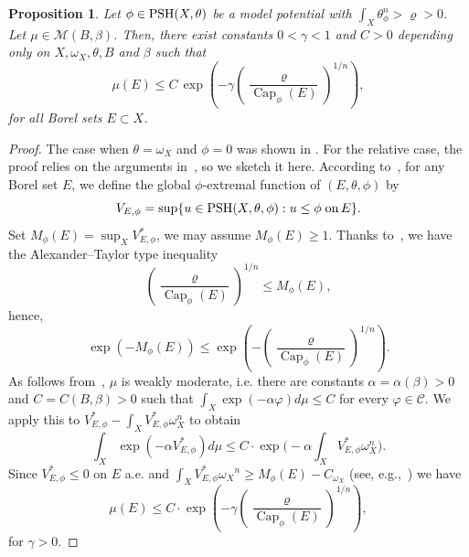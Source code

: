\documentclass[a4paper,11pt]{amsart}
\numberwithin{equation}{section}
\newtheorem{proposition}[theorem]{Proposition}
\theoremstyle{definition}
\newcommand{\dist}{\mathop{\mathrm{dist}}\nolimits}
\newcommand{\PSH}{{\rm PSH}}
\newcommand{\capacity}{\mathop{\mathrm{Cap}}\nolimits}
\begin{document}
 
\begin{proposition}\label{the exp cap}
	Let $\phi\in \PSH(X, \theta)$ be a model potential with $\int_X\theta_{\phi}^n>\varrho>0$. 
    Let $\mu\in\mathcal{M}(B,\beta)$.
    Then, there exist constants
	$0<\gamma<1$ and $C>0$ depending only on $X, \omega_X, \theta, B$ and $\beta$ such that
	\begin{equation}\label{eq0 the exp cap}
		\mu (E)\leq C\,
		\exp\left(-\gamma\left(\dfrac{\varrho}{\capacity_{\phi}(E)}\right)^{1/n} \right),
	\end{equation}
	for all Borel sets $E\subset X$. 
\end{proposition}
\begin{proof} The case when $\theta=\omega_X$ and $\phi=0$ was shown in \cite[Propositions 2.4, 4.4]{dinh2014characterization}. For the relative case,
   the proof relies on the arguments in~\cite[Proposition 4.30]{darvas2018monotonicity}, so we sketch it here. 
   According to~\cite[Section 4A2]{darvas2018monotonicity}, for any Borel set $E$, we define the global $\phi$-extremal function of $(E,\theta,\phi)$ by
   \[V_{E,\phi}=\sup\{ u\in\PSH(X,\theta,\phi): u\leq \phi \;\text{on}\, E\}. \]
 Set $M_\phi(E)=\sup_X V^*_{E,\phi}$, we may assume $M_\phi(E)\geq 1$.  Thanks to~\cite[Lemma 4.9]{darvas2018monotonicity}, we have the Alexander--Taylor type inequality
 \[ \left(\frac{\varrho}{\capacity_{\phi}(E)}\right)^{1/n} \leq M_\phi(E),\]
 hence,
 \[ \exp(-M_\phi(E))\leq \exp\left(-\left(\frac{\varrho}{\capacity_{\phi}(E)}\right)^{1/n} \right). \] 
  As follows from~\cite[Proposition 4.4]{dinh2014characterization}, $\mu$ is weakly moderate, i.e. there are constants $\alpha=\alpha(\beta)>0$ and $C=C(B,\beta)>0$ such that $\int_X \exp(-\alpha \varphi)d\mu\leq C$ for every $\varphi\in\mathcal 
   C$. We apply this to $V_{E,\phi}^*-\int_X V_{E,\phi}^*\omega_X^n$ to obtain 
   \[\int_X\exp(-\alpha V_{E,\phi}^*)d\mu\leq C\cdot \exp\bigg(-\alpha\int_XV_{E,\phi}^*\omega_X^n\bigg). \]
   Since $V_{E,\phi}^*\leq 0$ on $E$ a.e. and $\int_X V_{E,\phi}^*{\omega_X}^n\geq M_\phi(E)-C_{\omega_X}$ (see, e.g.,~\cite[Proposition 8.5]{guedj2017degenerate}) we have
   \[ \mu(E)\leq C\cdot\exp\left(-\gamma\left(\frac{\varrho}{\capacity_{\phi}(E)}\right)^{1/n} \right),\] for $\gamma>0$. 
\end{proof}
\end{document}
